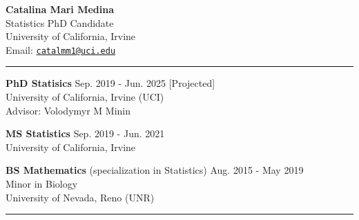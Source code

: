 \documentclass{article}
\makeatletter
\newcommand{\myname}{Catalina Mari Medina}
\newcommand{\myemail}{catalmm1@uci.edu}
\newcommand{\myhomeaddress}{Statistics PhD Candidate\\ %
	 University of California, Irvine \\ 
	 Email: \texttt{\href{mailto:\myemail}{\myemail}}
 }
\makeatother
\begin{document}
\thispagestyle{empty}
\phantom{.}\vspace{-2cm}
\begin{center}
	{\huge \bf \myname}\\
	\myhomeaddress
\end{center}

\vspace{-4mm}
\rule{\linewidth}{1pt}


\begin{description}
	\vspace{-2mm}
	\item[Education]\hspace*{.1in}
	
		\textbf{PhD Statisics} \hfill{Sep. 2019 - Jun. 2025 [Projected]} \\
		University of California, Irvine (UCI)\\ 
		Advisor: Volodymyr M Minin
		\vspace*{1mm}
		
		\textbf{MS Statistics} \hfill{Sep. 2019 - Jun. 2021}\\
		University of California, Irvine
		\vspace*{1mm}
		
		\textbf{BS Mathematics} (specialization in Statistics) \hfill{Aug. 2015 - May 2019} \\
		Minor in Biology\\
		University of Nevada, Reno (UNR)
		
\end{description}
\vspace{-2mm}
\rule{\linewidth}{1pt}
\end{document}

